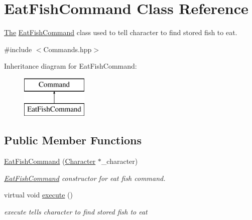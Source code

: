 \hypertarget{class_eat_fish_command}{}\section{Eat\+Fish\+Command Class Reference}
\label{class_eat_fish_command}


\hyperlink{namespace_the}{The} \hyperlink{class_eat_fish_command}{Eat\+Fish\+Command} class used to tell character to find stored fish to eat.  




{\ttfamily \#include $<$Commands.\+hpp$>$}

Inheritance diagram for Eat\+Fish\+Command\+:\begin{figure}[H]
\begin{center}
\leavevmode
\includegraphics[height=2.000000cm]{class_eat_fish_command}
\end{center}
\end{figure}
\subsection*{Public Member Functions}
\begin{DoxyCompactItemize}
\item 
\hyperlink{class_eat_fish_command_a3b5ce99ddf3c8a8a8bf20d963027543b}{Eat\+Fish\+Command} (\hyperlink{class_character}{Character} $\ast$\+\_\+character)
\begin{DoxyCompactList}\small\item\em \hyperlink{class_eat_fish_command}{Eat\+Fish\+Command} constructor for eat fish command. \end{DoxyCompactList}\item 
\hypertarget{class_eat_fish_command_ac7c77c704bf8cdaf1a6bd8b65ff49fb7}{}virtual void \hyperlink{class_eat_fish_command_ac7c77c704bf8cdaf1a6bd8b65ff49fb7}{execute} ()\label{class_eat_fish_command_ac7c77c704bf8cdaf1a6bd8b65ff49fb7}

\begin{DoxyCompactList}\small\item\em execute tells character to find stored fish to eat \end{DoxyCompactList}\end{DoxyCompactItemize}



